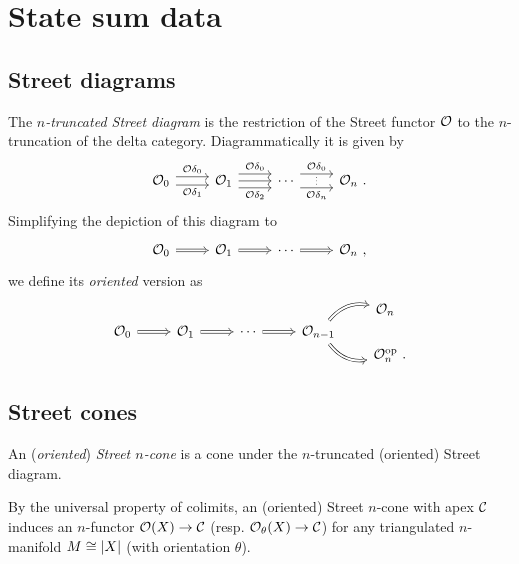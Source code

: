 
\section{State sum data}
\label{sec:statesum}

\subsection{Street diagrams}

The \textit{$n$-truncated Street diagram} is the restriction of the Street functor $\mathcal{O}$ to the $n$-truncation of the delta category.
Diagrammatically it is given by
\[
\begin{tikzcd}
	\oriental_0
	\arrow[r,shift left=3pt, "\oriental{\delta_0}"] \arrow[r,shift right=3pt, "\oriental{\delta_1}"'] & \oriental_1
	\arrow[r,shift left=5pt, "\oriental{\delta_0}"] \arrow[r,shift right=5pt, "\oriental{\delta_2}"'] \rar &
	\dotsb
	\arrow[r,shift left=5pt, "\oriental{\delta_0}"] \arrow[r,shift right=5pt, "\oriental{\delta_n}"', "\scalebox{0.6}{$\vdots$}"] &
	\oriental_{n} \ .
\end{tikzcd}
\]
Simplifying the depiction of this diagram to
\[
\begin{tikzcd}
	\oriental_0
	\arrow[r, Rightarrow] & \oriental_1
	\arrow[r, Rightarrow] & \dotsb
	\arrow[r, Rightarrow] & \oriental_n \ ,
\end{tikzcd}
\]
we define its \textit{oriented} version as
\[
\begin{tikzcd}[column sep=normal, row sep=0]
	& & & &[-5pt] \oriental_n \ \ \\
	\oriental_0
	\arrow[r, Rightarrow] & \oriental_1
	\arrow[r, Rightarrow] & \dotsb
	\arrow[r, Rightarrow] & \oriental_{n-1}
	\arrow[ur, Rightarrow, bend left] \arrow[dr, Rightarrow, bend right] & \\
	& & & & \oriental_n^\op \ .
\end{tikzcd}
\]

\subsection{Street cones}

An (\textit{oriented}) \textit{Street $n$-cone} is a cone under the $n$-truncated (oriented) Street diagram.

By the universal property of colimits, an (oriented) Street $n$-cone with apex $\mathcal{C}$ induces an $n$-functor $\mathcal{O}(X) \to \mathcal{C}$ (resp. $\mathcal{O}_\theta(X) \to \mathcal{C}$) for any triangulated $n$-manifold $M \cong \lvert X\rvert$ (with orientation $\theta$).

